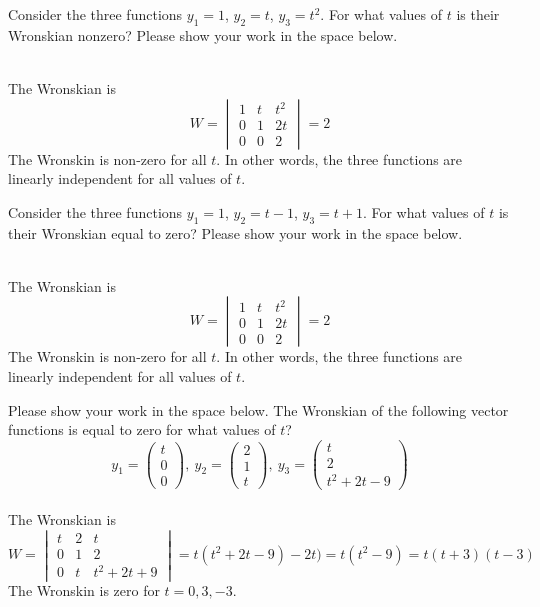\ifnum {}
\question[2] Consider the three functions $y_1 = 1$, $y_2 = t$, $y_3 = t^2$. For what values of $t$ is their Wronskian nonzero? Please show your work in the space below. 
\ifnum {} {\color{DarkBlue} \\[12pt] The Wronskian is $$W = \begin{vmatrix} 1&t&t^2\\0&1&2t\\0&0&2 \end{vmatrix} = 2$$ The Wronskin is non-zero for all $t$. In other words, the three functions are linearly independent for all values of $t$.

} 
\else 
\vfill
\fi
\fi


\ifnum {}
\question[2] Consider the three functions $y_1 = 1$, $y_2 = t-1$, $y_3 = t+1$. For what values of $t$ is their Wronskian equal to zero? Please show your work in the space below. 
\ifnum {} {\color{DarkBlue} \\[12pt] The Wronskian is $$W = \begin{vmatrix} 1&t&t^2\\0&1&2t\\0&0&2 \end{vmatrix} = 2$$ The Wronskin is non-zero for all $t$. In other words, the three functions are linearly independent for all values of $t$.

} 
\else 
\vfill
\fi
\fi

\ifnum {}
\question[2] Please show your work in the space below. The Wronskian of the following vector functions is equal to zero for what values of $t$?  
$$y_1 = \begin{pmatrix} t\\0\\0\end{pmatrix}, \ y_2 = \begin{pmatrix} 2\\1\\t\end{pmatrix}, \ y_3 = \begin{pmatrix} t\\2\\t^2+2t-9 \end{pmatrix}$$
\ifnum {} {\color{DarkBlue} \\[12pt] The Wronskian is $$W = \begin{vmatrix} t&2&t\\0&1&2\\0&t&t^2+2t+9\end{vmatrix} = t(t^2+2t-9)-2t) = t(t^2-9) = t(t+3)(t-3)$$  The Wronskin is zero for $t =0,3,-3$. 
} 
\else 
\vfill
\fi
\fi


